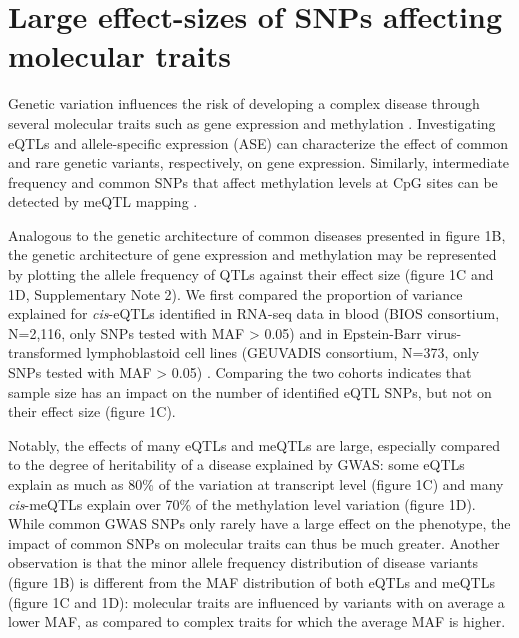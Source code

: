 \section{Large effect-sizes of SNPs affecting molecular traits}
Genetic variation influences the risk of developing a complex disease through several molecular traits such as gene expression \cite{emilssonGeneticsGeneExpression2008} and methylation \cite{conerlyInsightsRoleDNA2010}. Investigating eQTLs \cite{pickrellUnderstandingMechanismsUnderlying2010,lappalainenTranscriptomeGenomeSequencing2013,westraSystematicIdentificationTrans2013,zhernakovaIdentificationContextdependentExpression2017,gibsonExpressionQuantitativeTrait2015} and allele-specific expression (ASE) \cite{deelenCallingGenotypesPublic2015,pirinenAssessingAllelespecificExpression2015,rivasEffectPredictedProteintruncating2015,castelToolsBestPractices2015} can characterize the effect of common and rare genetic variants, respectively, on gene expression. Similarly, intermediate frequency and common SNPs that affect methylation levels at CpG sites can be detected by meQTL mapping \cite{bonderDiseaseVariantsAlter2017}.

Analogous to the genetic architecture of common diseases presented in figure 1B, the genetic architecture of gene expression and methylation may be represented by plotting the allele frequency of QTLs against their effect size (figure 1C and 1D, Supplementary Note 2). We first compared the proportion of variance explained for \emph{cis}-eQTLs identified in RNA-seq data in blood (BIOS consortium, N=2,116, only SNPs tested with MAF > 0.05) \cite{zhernakovaIdentificationContextdependentExpression2017} and in Epstein-Barr virus-transformed lymphoblastoid cell lines (GEUVADIS consortium, N=373, only SNPs tested with MAF > 0.05) \cite{lappalainenTranscriptomeGenomeSequencing2013}. Comparing the two cohorts indicates that sample size has an impact on the number of identified eQTL SNPs, but not on their effect size (figure 1C). 

Notably, the effects of many eQTLs and meQTLs are large, especially compared to the degree of heritability of a disease explained by GWAS: some eQTLs explain as much as 80\% of the variation at transcript level (figure 1C) and many \emph{cis}-meQTLs explain over 70\% of the methylation level variation (figure 1D). While common GWAS SNPs only rarely have a large effect on the phenotype, the impact of common SNPs on molecular traits can thus be much greater. 
Another observation is that the minor allele frequency distribution of disease variants (figure 1B) is different from the MAF distribution of both eQTLs and meQTLs (figure 1C and 1D): molecular traits are influenced by variants with on average a lower MAF, as compared to complex traits for which the average MAF is higher.

